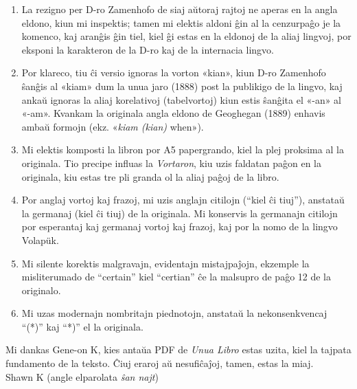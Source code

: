 \documentclass[12pt,twoside]{book}
\begin{document}
\begin{enumerate}

\item La rezigno per D-ro Zamenhofo de siaj aŭtoraj rajtoj ne aperas en la angla eldono, kiun mi inspektis; tamen mi elektis aldoni ĝin al la cenzurpaĝo je la komenco, kaj aranĝis ĝin tiel, kiel ĝi estas en la eldonoj de la aliaj lingvoj, por eksponi la karakteron de la D-ro kaj de la internacia lingvo.

\item Por klareco, tiu ĉi versio ignoras la vorton «kian», kiun D-ro Zamenhofo ŝanĝis al «kiam» dum la unua jaro (1888) post la publikigo de la lingvo, kaj ankaŭ ignoras la aliaj korelativoj (tabelvortoj) kiun estis ŝanĝita el «-an» al «-am». Kvankam la originala angla eldono de Geoghegan (1889) enhavis ambaŭ formojn (ekz. «\emph{kiam (kian)} when»).

\item Mi elektis komposti la libron por A5 papergrando, kiel la plej proksima al la originala.  Tio precipe influas la \emph{Vortaron}, kiu uzis faldatan paĝon en la originala, kiu estas tre pli granda ol la aliaj paĝoj de la libro.

\item Por anglaj vortoj kaj frazoj, mi uzis anglajn citilojn (``kiel ĉi tiuj''), anstataŭ la germanaj (\glqq{}kiel ĉi tiuj\grqq{}) de la originala.  Mi konservis la germanajn citilojn por esperantaj kaj germanaj vortoj kaj frazoj, kaj por la nomo de la lingvo Volap\"{u}k.

\item Mi silente korektis malgravajn, evidentajn mistajpaĵojn, ekzemple la misliterumado de ``certain'' kiel ``certian'' ĉe la malsupro de paĝo 12 de la originalo.

\item Mi uzas modernajn nombritajn piednotojn, anstataŭ la nekonsenkvencaj ``(*)'' kaj ``*)'' el la originala.

\end{enumerate}

Mi dankas Gene-on K, kies antaŭa PDF de \emph{Unua Libro} estas uzita, kiel la tajpata fundamento de la teksto.  Ĉiuj eraroj aŭ nesufiĉaĵoj, tamen, estas la miaj.\\[1ex]

{\setlength{\parindent}{0em}
Shawn K (angle elparolata \emph{ŝan najt})\\
\hodiau}


\end{document}
